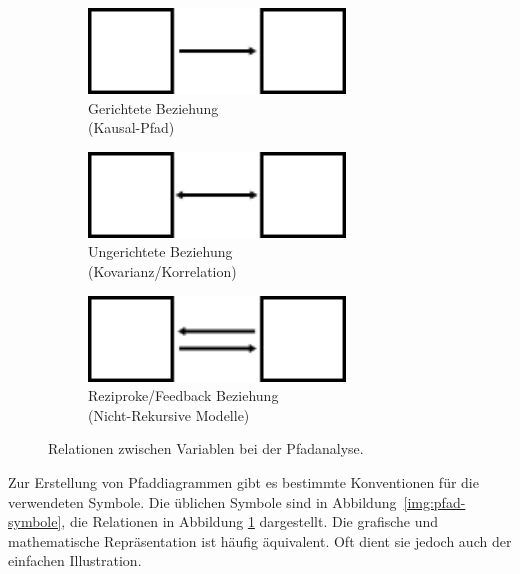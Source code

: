 \documentclass{article}
\numberwithin{equation}{section}
\begin{document}
\begin{figure}[h]
  \centering
  \captionsetup{justification=centering}
  \begin{subfigure}[b]{0.3\textwidth}
    \centering
    \includegraphics[width=0.75\textwidth]{images/pfad-symbole/gerichtet.png}
    \caption{Gerichtete Beziehung\\ (\glqq Kausal\grqq -Pfad)}
  \end{subfigure}
  \begin{subfigure}[b]{0.3\textwidth}
    \centering
    \includegraphics[width=0.75\textwidth]{images/pfad-symbole/ungerichtet.png}
    \caption{Ungerichtete Beziehung\\ (Kovarianz/Korrelation)}
  \end{subfigure}
  \begin{subfigure}[b]{0.3\textwidth}
    \centering
    \includegraphics[width=0.75\textwidth]{images/pfad-symbole/reziprok.png}
    \caption{Reziproke/Feedback Beziehung\\ (Nicht-Rekursive Modelle)}
  \end{subfigure}
  \caption{Relationen zwischen Variablen bei der Pfadanalyse.}
  \label{img:pfad-relationen}
\end{figure}

Zur Erstellung von Pfaddiagrammen gibt es bestimmte Konventionen für die verwendeten Symbole. Die üblichen Symbole sind in Abbildung~\ref{img:pfad-symbole}, die Relationen in Abbildung \ref{img:pfad-relationen} dargestellt. Die grafische und mathematische Repräsentation ist häufig äquivalent. Oft dient sie jedoch auch der einfachen Illustration.
\end{document}
